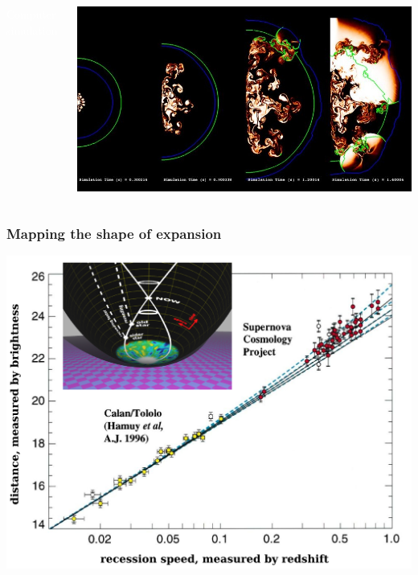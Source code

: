 \documentclass[compress]{beamer}
\begin{document}
\begin{frame}
\begin{columns}
\vspace{0.1 cm}
\centering \textcolor{white}{Computer simulation}

\vspace{0.1 cm}
\includegraphics[width=\linewidth]{pictures/type1a_simulation.jpg}

\end{columns}
\end{frame}
\endgroup

\begin{frame}
\frametitle{Mapping the shape of expansion}
\includegraphics[width=\linewidth]{pictures/distance_versus_speed.png}
\end{frame}
\end{document}
